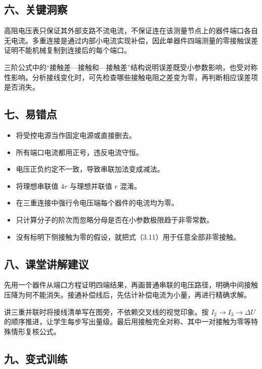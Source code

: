 \documentclass[12pt,a4paper,fontset=fandol]{ctexart}
\providecommand{\tightlist}{\setlength{\itemsep}{0pt}\setlength{\parskip}{0pt}}
\begin{document}
\subsection{六、关键洞察}\label{ux516dux5173ux952eux6d1eux5bdf-2}

高阻电压表只保证其外部支路不流电流，不保证连在该测量节点上的器件端口各自无电流。多重连接是通过内部小电流实现补偿，因此单器件四端测量的零接触误差证明不能机械复制到连接后的每个端口。

三阶公式中的``接触差---接触和---接触差''结构说明误差既受小参数影响，也受对称性影响。分析接线变化时，可先检查哪些接触电阻之差变为零，再判断相应误差项是否消失。

\subsection{七、易错点}\label{ux4e03ux6613ux9519ux70b9-2}

\begin{itemize}
\tightlist
\item
  将受控电源当作固定电源或直接删去。
\item
  所有端口电流都用正号，违反电流守恒。
\item
  电压正负约定不一致，导致串联加法变成减法。
\item
  将理想串联值 \(4r\) 与理想并联值 \(r\) 混淆。
\item
  在三重连接中强行令电压端每个器件的电流均为零。
\item
  只计算分子的阶次而忽略分母是否在小参数极限趋于非零常数。
\item
  没有标明下侧接触为零的假设，就把式（3.11）用于任意全部非零接触。
\end{itemize}

\subsection{八、课堂讲解建议}\label{ux516bux8bfeux5802ux8bb2ux89e3ux5efaux8bae-2}

先用一个器件从端口方程证明四端结果，再画普通串联的电压路径，明确中间接触压降为何不能消失。接通补偿线后，先估计补偿电流为小量，再进行精确求解。

讲三重并联时将接线清单写在图旁，不依赖交叉线的视觉印象。按
\(I_2\to I_3\to \Delta U\)
的顺序推进，让学生每步写出量级。最后用接触完全对称、其中一对接触为零等特殊情形复核公式。

\subsection{九、变式训练}\label{ux4e5dux53d8ux5f0fux8badux7ec3-2}
\end{document}
